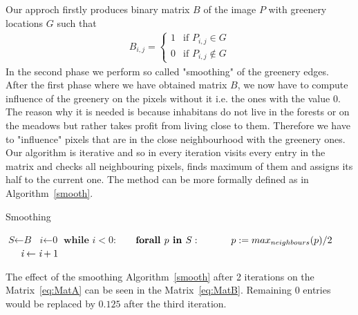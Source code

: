 \documentclass[letterpaper]{article}
\begin{document}
\indent Our approch firstly produces binary matrix $B$ of the image $P$ with greenery locations $G$ such that
\newline
\begin{align*}
B_{i,j} = \begin{cases} 1 & \text{if } P_{i,j} \in G\\
                         0 & \text{if } P_{i,j} \notin G
\end{cases}
\end{align*}
\newline
In the second phase we perform so called "smoothing" of the greenery edges. After the first phase where we have obtained matrix $B$,
we now have to compute influence of the greenery on the pixels without it i.e. the ones with the value 0. The reason why it is needed is
because inhabitans do not live in the forests or on the meadows but rather takes profit from living close to them. Therefore we have
to "influence" pixels that are in the close neighbourhood with the greenery ones. Our algorithm is iterative and so in every iteration
visits every entry in the matrix and checks all neighbouring pixels, finds maximum of them and assigns its half to the current one.
The method can be more formally defined as in Algorithm~\ref{smooth}.

\begin{algorithm}
    \caption{Smoothing}\label{smooth}
    \begin{algorithmic}[1]
    \State $\textit{S} \gets \textit{B}$
    \State $\textit{i} \gets \textit{0}$
    \State $\textbf{while } \textit{i} < 0:$
    \State $\indent \textbf{forall } p \textbf{ in } S:$
    \State $\indent \indent p := max_{neighbours}(p) / 2$
    \State $\indent \textit{i} \gets \textit{i} + 1$
    \EndProcedure
    \end{algorithmic}
    \end{algorithm}

The effect of the smoothing Algorithm~\ref{smooth} after 2 iterations on the Matrix~\ref{eq:MatA}
can be seen in the Matrix~\ref{eq:MatB}. Remaining $0$ entries would be replaced by $0.125$ after
the third iteration.
\end{document}
